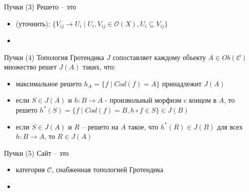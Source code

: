 \documentclass{beamer}
\begin{document}
\begin{frame}{Пучки (3)}
Решето -- это\\
\medskip
\begin{small}
\begin{itemize}
	\item (уточнить): $\{ V_{ij} \to U_i \; \vert \; U_i, V_{ij} \in \mathcal{O}(X), U_i \subseteq V_{ij} \}$
	\item 
\end{itemize}
\end{small}
\end{frame}

\begin{frame}{Пучки (4)}
Топология Гротендика $J$ сопоставляет каждому объекту $A \in Ob(\mathcal{C})$ множество решет $J(A)$ таких, что:\\
\medskip
\begin{small}
\begin{itemize}
	\item максимальное решето $h_A = \{ f \; \vert \; Cod(f) = A \}$ принадлежит $J(A)$
	\item если $S \in J(A)$ и $h : B \to A$ - произвольный морфизм c концом в $A$, то решето $h^*(S) = \{ f \; \vert \; Cod(f) = B, h \circ f \in S \} \in J(B)$
	\item если $S \in J(A)$ и $R$ -- решето на $A$ такое, что $h^*(R) \in J(B)$ для всех $h : B \to A$, то $R \in J(A)$
\end{itemize}
\end{small}
\end{frame}

\begin{frame}{Пучки (5)}
Сайт -- это\\
\medskip
\begin{small}
\begin{itemize}
	\item категория $\mathcal{C}$, снабженная топологией Гротендика
	\item 
\end{itemize}
\end{small}
\end{frame}
\end{document}

